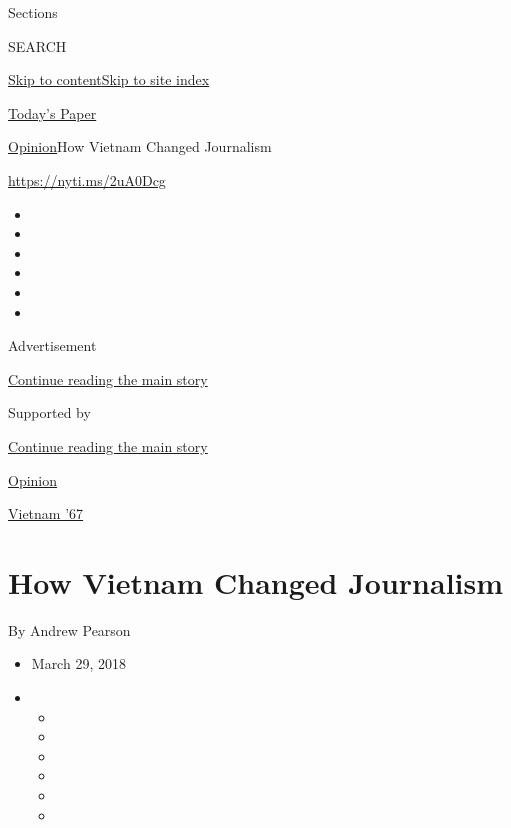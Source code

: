 Sections

SEARCH

\protect\hyperlink{site-content}{Skip to
content}\protect\hyperlink{site-index}{Skip to site index}

\href{https://myaccount.nytimes3xbfgragh.onion/auth/login?response_type=cookie\&client_id=vi}{}

\href{https://www.nytimes3xbfgragh.onion/section/todayspaper}{Today's
Paper}

\href{/section/opinion}{Opinion}\textbar{}How Vietnam Changed Journalism

\url{https://nyti.ms/2uA0Dcg}

\begin{itemize}
\item
\item
\item
\item
\item
\item
\end{itemize}

Advertisement

\protect\hyperlink{after-top}{Continue reading the main story}

Supported by

\protect\hyperlink{after-sponsor}{Continue reading the main story}

\href{/section/opinion}{Opinion}

\href{/column/vietnam-67}{Vietnam '67}

\hypertarget{how-vietnam-changed-journalism}{%
\section{How Vietnam Changed
Journalism}\label{how-vietnam-changed-journalism}}

By Andrew Pearson

\begin{itemize}
\item
  March 29, 2018
\item
  \begin{itemize}
  \item
  \item
  \item
  \item
  \item
  \item
  \end{itemize}
\end{itemize}


